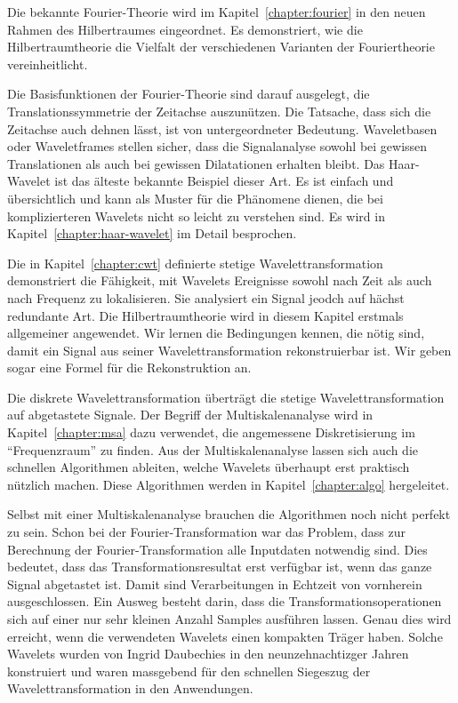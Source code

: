 Die bekannte Fourier-Theorie wird im Kapitel~\ref{chapter:fourier} in
den neuen Rahmen des Hilbertraumes eingeordnet.
Es demonstriert, wie die Hilbertraumtheorie die Vielfalt der 
verschiedenen Varianten der Fouriertheorie vereinheitlicht.

Die Basisfunktionen der Fourier-Theorie sind darauf ausgelegt,
die Translationssymmetrie der Zeitachse auszunützen.
Die Tatsache, dass sich die Zeitachse auch dehnen lässt, ist von
untergeordneter Bedeutung.
Waveletbasen oder Waveletframes stellen sicher, dass die Signalanalyse
sowohl bei gewissen Translationen als auch bei gewissen Dilatationen
erhalten bleibt.
%
%
Das Haar-Wavelet ist das älteste bekannte Beispiel dieser Art.
Es ist einfach und übersichtlich und kann als Muster für die
Phänomene dienen, die bei komplizierteren Wavelets nicht so leicht
zu verstehen sind.
Es wird in Kapitel~\ref{chapter:haar-wavelet} im Detail besprochen.

Die in Kapitel~\ref{chapter:cwt} definierte stetige Wavelettransformation
%
demonstriert die Fähigkeit, mit Wavelets Ereignisse sowohl nach Zeit
als auch nach Frequenz zu lokalisieren.
Sie analysiert ein Signal jeodch auf hächst redundante Art.
Die Hilbert\-raum\-theorie wird in diesem Kapitel erstmals allgemeiner
angewendet.
Wir lernen die Be\-ding\-ungen kennen, die nötig sind, damit ein Signal
aus seiner Wavelettransformation rekonstruierbar ist.
Wir geben sogar eine Formel für die Rekonstruktion an.

Die diskrete Wavelettransformation überträgt die stetige
Wavelettransformation auf abgetastete Signale.
Der Begriff der Multiskalenanalyse wird in Kapitel~\ref{chapter:msa}
dazu verwendet, die angemessene Diskretisierung im ``Frequenzraum''
zu finden.
Aus der Multiskalenanalyse lassen sich auch die schnellen Algorithmen
%
ableiten, welche Wavelets überhaupt erst praktisch nützlich machen.
Diese Algorithmen werden in Kapitel~\ref{chapter:algo} hergeleitet.

Selbst mit einer Multiskalenanalyse brauchen die Algorithmen noch nicht
perfekt zu sein.
Schon bei der Fourier-Transformation war das Problem, dass zur Berechnung
der Fourier-Trans\-for\-ma\-tion alle Inputdaten notwendig sind.
Dies bedeutet, dass das Transformationsresultat erst verfügbar ist,
wenn das ganze Signal abgetastet ist.
Damit sind Verarbeitungen in Echtzeit von vornherein ausgeschlossen.
Ein Ausweg besteht darin, dass die Transformationsoperationen sich auf
einer nur sehr kleinen Anzahl Samples ausführen lassen.
Genau dies wird erreicht, wenn die verwendeten Wavelets einen kompakten Träger
haben.
Solche Wavelets wurden von Ingrid Daubechies in den neunzehnachtizger
%
%
Jahren konstruiert und waren massgebend für den schnellen Siegeszug 
der Wavelettransformation in den Anwendungen.

